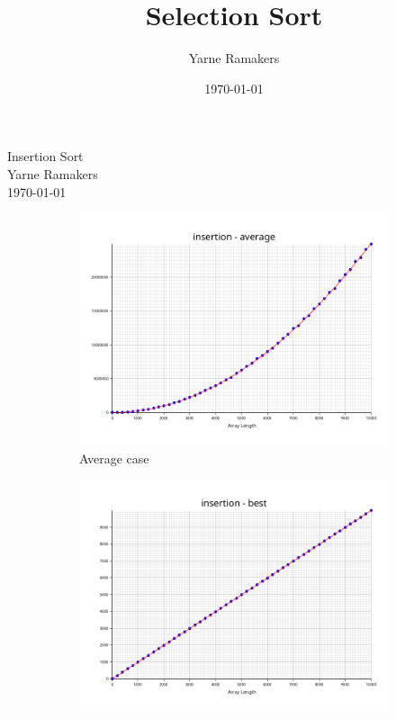 \documentclass[a4paper]{article}
\title{Selection Sort}
\author{Yarne Ramakers}
\date{\today}
\begin{document}
\begin{center}
  Insertion Sort \\
  Yarne Ramakers \\
  \today \\
\end{center}

\begin{figure}[h]
  \begin{subfigure}[b]{0.3\textwidth}
    \includegraphics[width=\textwidth]{../plots/insertion-average.png}
    \caption{Average case}
    \label{fig:insertion-avg}
  \end{subfigure}\hfill
  \begin{subfigure}[b]{0.3\textwidth}
    \includegraphics[width=\textwidth]{../plots/insertion-best.png}

\end{subfigure}
\end{figure}
\end{document}

